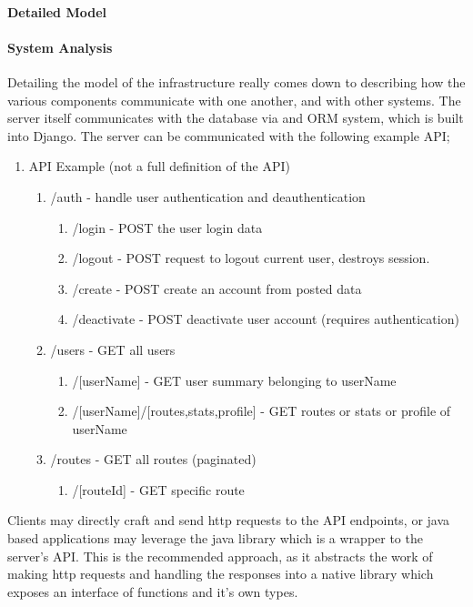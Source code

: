 ﻿\documentclass{article}
\begin{document}
\paragraph{Detailed Model}
\paragraph{System Analysis}
Detailing the model of the infrastructure really comes down to describing how the
various components communicate with one another, and with other systems.
The server itself communicates with the database via and ORM system, which is built into
Django. The server can be communicated with the following example API;

\begin{enumerate}
  \item API Example (not a full definition of the API)
    \begin{enumerate}
      \item /auth - handle user authentication and deauthentication
        \begin{enumerate}
          \item /login - POST the user login data
          \item /logout - POST request to logout current user, destroys session.
          \item /create - POST create an account from posted data
          \item /deactivate - POST deactivate user account (requires authentication)
        \end{enumerate}
      \item /users - GET all users
        \begin{enumerate}
          \item /[userName] - GET user summary belonging to userName
          \item /[userName]/[routes,stats,profile] - GET routes or stats or profile of userName
        \end{enumerate}
      \item /routes - GET all routes (paginated)
        \begin{enumerate}
          \item /[routeId] - GET specific route
        \end{enumerate}
    \end{enumerate}
\end{enumerate}

Clients may directly craft and send http requests to the API endpoints, or java based
applications may leverage the java library which is a wrapper to the server's API. This is
the recommended approach, as it abstracts the work of making http requests and handling the
responses into a native library which exposes an interface of functions and it's own types.
\end{document}

